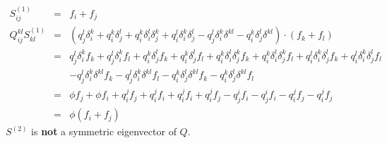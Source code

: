 \documentclass{article}
\begin{document}
\begin{eqnarray*}
  S_{ij}^{(1)} &=& f_i + f_j
\\
  Q_{ij}^{kl}S_{kl}^{(1)} &=& 
                \left(  q_j^l\delta_i^k + 
                        q_i^k\delta_j^l + 
                        q_i^k\delta_i^l\delta_j^k +
                        q_i^l\delta_i^k\delta_j^l - 
                        q_j^l\delta_i^k\delta^{kl} -    
                        q_i^k\delta_j^l\delta^{kl}\right)
        \cdot  \left(f_k + f_l\right)\\
  &=& q_j^l\delta_i^kf_k + q_j^l\delta_i^kf_l + 
      q_i^k\delta_j^lf_k + q_i^k\delta_j^lf_l + 
      q_i^k\delta_i^l\delta_j^kf_k + q_i^k\delta_i^l\delta_j^kf_l +     
      q_i^l\delta_i^k\delta_j^lf_k + q_i^l\delta_i^k\delta_j^lf_l \\
      && - q_j^l\delta_i^k\delta^{kl}f_k - q_j^l\delta_i^k\delta^{kl}f_l    
      - q_i^k\delta_j^l\delta^{kl}f_k - q_i^k\delta_j^l\delta^{kl}f_l\\
  &=& \phi f_j + \phi f_i + 
      q_i^jf_j + q_i^jf_i +     
      q_i^jf_i + q_i^jf_j 
      - q_j^if_i - q_j^if_i - q_i^jf_j - q_i^jf_j\\
  &=& \phi (f_i + f_j)
\end{eqnarray*}
$S^{(2)}$ is {\bf not} a symmetric eigenvector of $Q$.
\end{document}
